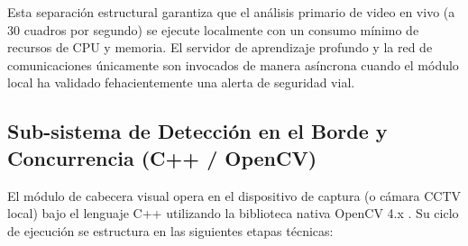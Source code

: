\documentclass[12pt]{article}
\begin{document}
Esta separación estructural garantiza que el análisis primario de video en vivo (a 30 cuadros por segundo) se ejecute localmente con un consumo mínimo de recursos de CPU y memoria. El servidor de aprendizaje profundo y la red de comunicaciones únicamente son invocados de manera asíncrona cuando el módulo local ha validado fehacientemente una alerta de seguridad vial.

\subsection{Sub-sistema de Detección en el Borde y Concurrencia (C++ / OpenCV)}
El módulo de cabecera visual opera en el dispositivo de captura (o cámara CCTV local) bajo el lenguaje C++ utilizando la biblioteca nativa OpenCV 4.x \cite{bradski2000opencv}. Su ciclo de ejecución se estructura en las siguientes etapas técnicas:
\end{document}
